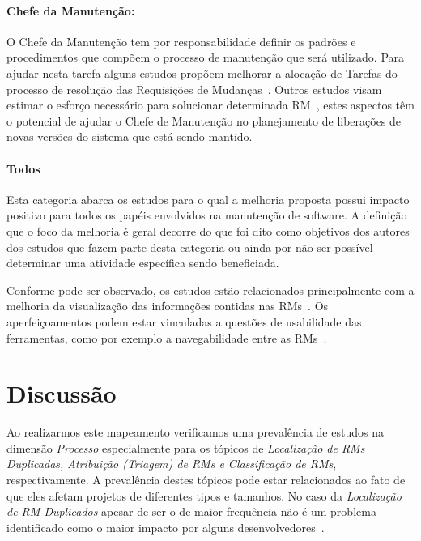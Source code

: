 \paragraph{Chefe da Manutenção:}

O Chefe da Manutenção tem por responsabilidade definir os padrões e
procedimentos que compõem o processo de manutenção que será utilizado. Para
ajudar nesta tarefa alguns estudos propõem melhorar a alocação de Tarefas do
processo de resolução das Requisições de Mudanças~\cite{netto2010automated}.
Outros estudos visam estimar o esforço necessário para solucionar determinada
RM~\cite{Vijayakumar2014, Nagwani2010}, estes aspectos têm o potencial de ajudar
o Chefe de Manutenção no planejamento de liberações de novas versões do sistema
que está sendo mantido.

\paragraph{Todos} Esta categoria abarca os estudos para o qual a melhoria
proposta possui impacto positivo para todos os papéis envolvidos na manutenção
de software. A definição que o foco da melhoria é geral decorre do que foi dito
como objetivos dos autores dos estudos que fazem parte desta categoria ou ainda
por não ser possível determinar uma atividade específica sendo beneficiada.

Conforme pode ser observado, os estudos estão relacionados principalmente com a
melhoria da  visualização das informações contidas nas RMs~\cite{hora2012bug,
	takama2013application, dal2014bug}. Os aperfeiçoamentos podem estar
vinculadas a questões de usabilidade das ferramentas, como por exemplo a
navegabilidade entre as RMs~\cite{dal2014bug}.

\section{Discussão}
\label{sec:discussao}

Ao realizarmos este mapeamento verificamos uma prevalência de estudos na
dimensão \textit{Processo} especialmente para os tópicos de \textit{Localização
	de RMs Duplicadas, Atribuição (Triagem) de RMs e Classificação de RMs},
respectivamente. A prevalência destes tópicos pode estar relacionados ao fato de
que eles afetam projetos de diferentes tipos e tamanhos. No caso da
\textit{Localização de RM Duplicados} apesar de ser o de maior frequência não é
um problema identificado como o maior impacto por alguns
desenvolvedores~\cite{Bettenburg2008a}.

